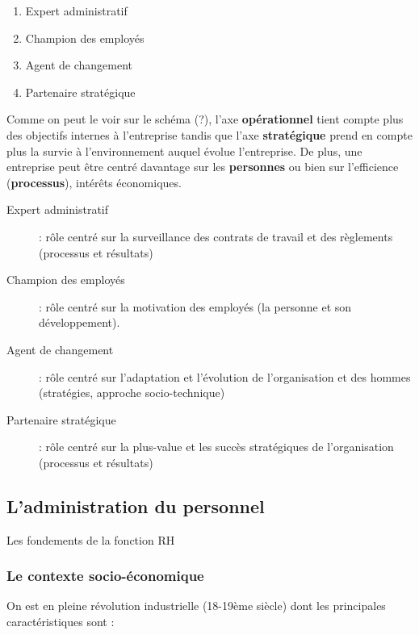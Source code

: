 \documentclass[12pt]{article}
\begin{document}
	  \begin{enumerate}
	   \item Expert administratif
	   \item Champion des employés
	   \item Agent de changement
	   \item Partenaire stratégique
	  \end{enumerate}

	  
	  Comme on peut le voir sur le schéma (?), l'axe \textbf{opérationnel} tient compte plus des objectifs internes à l'entreprise tandis que l'axe \textbf{stratégique} prend en compte plus la survie à l'environnement auquel évolue l'entreprise. De plus, une entreprise peut être centré davantage sur les \textbf{personnes} ou bien sur l'efficience (\textbf{processus}), intérêts économiques.\newline
	  
	  \begin{description}
	   \item[Expert administratif] : rôle centré sur la surveillance des contrats de travail et des règlements (processus et résultats)
	   \item[Champion des employés] : rôle centré sur la motivation des employés (la personne et son développement).
	   \item[Agent de changement] : rôle centré sur l'adaptation et l'évolution de l'organisation et des hommes (stratégies, approche socio-technique)
	   \item[Partenaire stratégique] : rôle centré sur la plus-value et les succès stratégiques de l'organisation (processus et résultats)
	  \end{description}
	  
	\subsection{L'administration du personnel}
	Les fondements de la fonction RH
	  \subsubsection{Le contexte socio-économique}
	  On est en pleine révolution industrielle (18-19ème siècle) dont les principales caractéristiques sont :
	  
\end{document}
